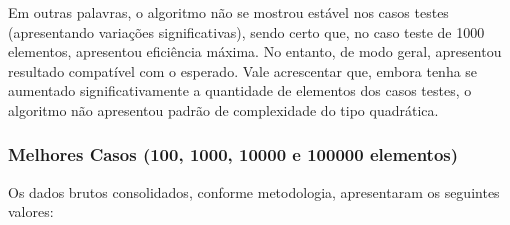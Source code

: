 \documentclass[a4paper, 12pt]{article}
\begin{document}
Em outras palavras, o algoritmo não se mostrou estável nos casos testes (apresentando variações significativas), sendo certo que, no caso teste de 1000 elementos, apresentou eficiência máxima. No entanto, de modo geral, apresentou resultado compatível com o esperado. Vale acrescentar que, embora tenha se aumentado significativamente a quantidade de elementos dos casos testes, o algoritmo não apresentou padrão de complexidade do tipo quadrática.

\subsubsection{Melhores Casos (100, 1000, 10000 e 100000 elementos)}
\tab{ }Os dados brutos consolidados, conforme metodologia, apresentaram os seguintes valores:
\vspace{0.5cm}
\end{document}
